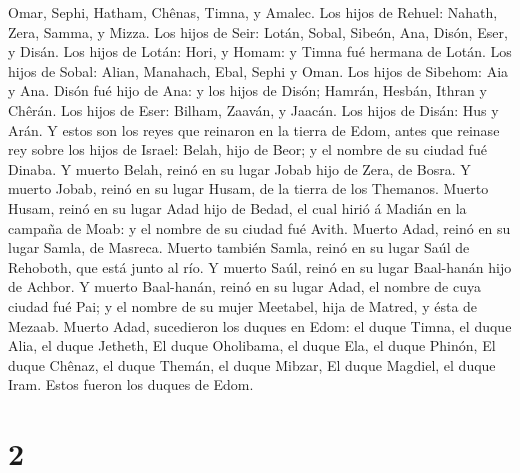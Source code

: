 Omar, Sephi, Hatham, Chênas, Timna, y Amalec.  Los hijos de
Rehuel: Nahath, Zera, Samma, y Mizza.  Los hijos de Seir:
Lotán, Sobal, Sibeón, Ana, Disón, Eser, y Disán.  Los hijos
de Lotán: Hori, y Homam: y Timna fué hermana de Lotán.  Los
hijos de Sobal: Alian, Manahach, Ebal, Sephi y Oman. Los hijos de
Sibehom: Aia y Ana.  Disón fué hijo de Ana: y los hijos de
Disón; Hamrán, Hesbán, Ithran y Chêrán.  Los hijos de Eser:
Bilham, Zaaván, y Jaacán. Los hijos de Disán: Hus y Arán. 
Y estos son los reyes que reinaron en la tierra de Edom, antes que
reinase rey sobre los hijos de Israel: Belah, hijo de Beor; y el nombre
de su ciudad fué Dinaba.  Y muerto Belah, reinó en su lugar
Jobab hijo de Zera, de Bosra.  Y muerto Jobab, reinó en su
lugar Husam, de la tierra de los Themanos.  Muerto Husam,
reinó en su lugar Adad hijo de Bedad, el cual hirió á Madián en la
campaña de Moab: y el nombre de su ciudad fué Avith. 
Muerto Adad, reinó en su lugar Samla, de Masreca.  Muerto
también Samla, reinó en su lugar Saúl de Rehoboth, que está junto al
río.  Y muerto Saúl, reinó en su lugar Baal-hanán hijo de
Achbor.  Y muerto Baal-hanán, reinó en su lugar Adad, el
nombre de cuya ciudad fué Pai; y el nombre de su mujer Meetabel, hija de
Matred, y ésta de Mezaab.  Muerto Adad, sucedieron los
duques en Edom: el duque Timna, el duque Alia, el duque Jetheth,
 El duque Oholibama, el duque Ela, el duque Phinón,
 El duque Chênaz, el duque Themán, el duque Mibzar,
 El duque Magdiel, el duque Iram. Estos fueron los duques
de Edom.

\hypertarget{section-1}{%
\section{2}\label{section-1}}

